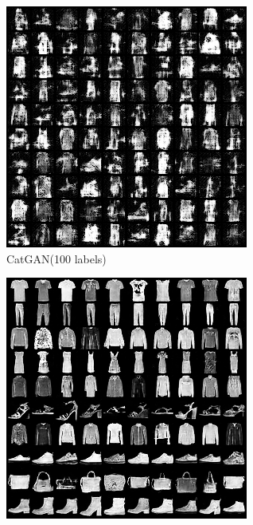 \begin{figure}[htbp]
  \begin{subfigure}[b]{\trif\textwidth}
    \includegraphics[width=\textwidth]{Img/fa-cg-100labels.png}
    \caption{CatGAN(100 labels)}
  \end{subfigure}
  \begin{subfigure}[b]{\trif\textwidth}
    \includegraphics[width=\textwidth]{Img/fa-icg-100labels.png}

\end{subfigure}
\end{figure}
